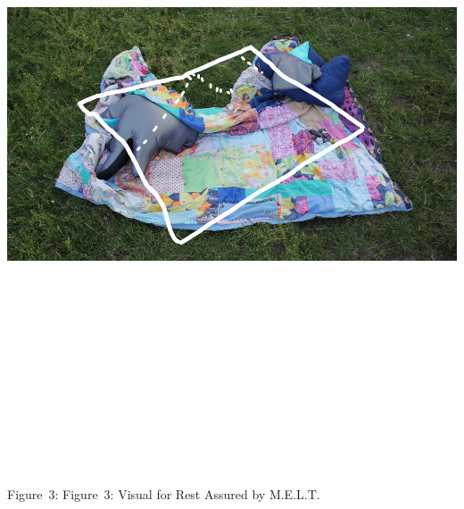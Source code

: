 \includegraphics[width=13.88889in,height=7.81944in]{../../Chapters/media_02_Crip-Tic_of_Vignettes/Pictures/2.png}

Figure~3: Figure~3: Visual for Rest Assured by M.E.L.T.


